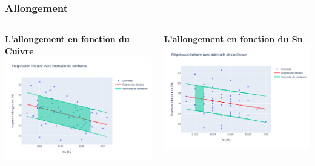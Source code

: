 \documentclass[aspectratio=169]{beamer}
\begin{document}
\begin{frame}
\frametitle{Allongement}
\begin{columns}[t]
  \begin{column}{0.5\textwidth}
    \centering
    \textbf{L'allongement en fonction du Cuivre} \\
    \includegraphics[width=\textwidth]{Figures/Regression_Cu_Allongement.pdf} 
  \end{column}
  \begin{column}{0.5\textwidth}
    \centering
    \textbf{L'allongement en fonction du Sn} \\
    \includegraphics[width=\textwidth]{Figures/Regression_Sn_Allongement.pdf} 
  \end{column}
\end{columns}
\end{frame}
\end{document}
